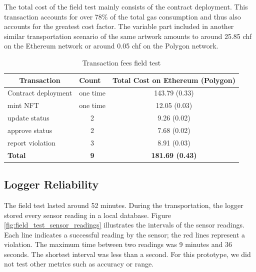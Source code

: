 The total cost of the field test mainly consists of the contract deployment. This transaction accounts for over 78\% of the total gas consumption and thus also accounts for the greatest cost factor. The variable part included in another similar transportation scenario of the same artwork amounts to around 25.85 \gls{chf} on the Ethereum network or around 0.05 \gls{chf} on the Polygon network.

\begin{table}[ht]
\centering
\begin{tabular}{lcc}
\multicolumn{1}{c}{\textbf{Transaction}} & \multicolumn{1}{l}{\textbf{Count}} & \multicolumn{1}{c}{\textbf{Total Cost on Ethereum (Polygon)}} \\ \hline
Contract deployment                      & one time                           & 143.79 (0.33)          \\
mint NFT                                 & one time                           & 12.05 (0.03)           \\
update status                            & 2                                  & 9.26 (0.02)            \\
approve status                           & 2                                  & 7.68 (0.02)            \\
report violation                         & 3                                  & 8.91 (0.03)            \\ \hline
\textbf{Total}                           & \textbf{9}                         & \textbf{181.69 (0.43)} \\
\hline
\end{tabular}
\caption{Transaction fees field test}
\label{tab:field_test_tx_fees}
\end{table}

\subsection{Logger Reliability}
The field test lasted around 52 minutes. During the transportation, the logger stored every sensor reading in a local database. Figure \ref{fig:field_test_sensor_readings} illustrates the intervals of the sensor readings. Each line indicates a successful reading by the sensor; the red lines represent a violation. The maximum time between two readings was 9 minutes and 36 seconds. The shortest interval was less than a second. For this prototype, we did not test other metrics such as accuracy or range.

